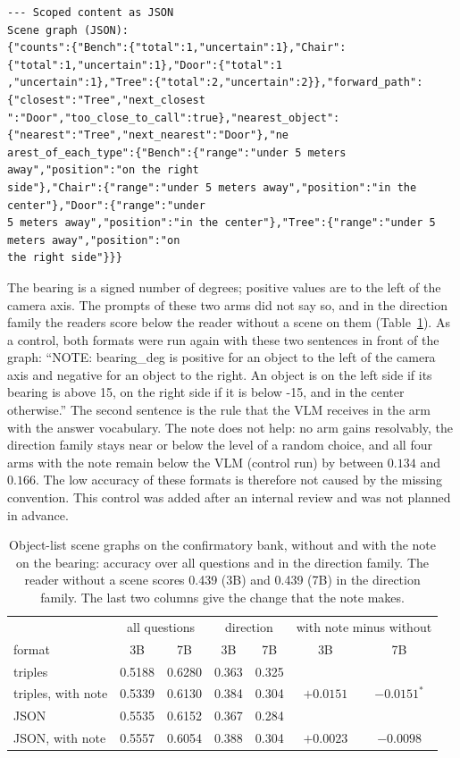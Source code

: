 \documentclass[10pt]{article}
\renewcommand{\thetable}{S\arabic{table}}
\newcommand{\settab}[1]{\setcounter{table}{#1}\addtocounter{table}{-1}\renewcommand{\thetable}{S\arabic{table}}}
\begin{document}
{\begin{verbatim}
--- Scoped content as JSON
Scene graph (JSON):
{"counts":{"Bench":{"total":1,"uncertain":1},"Chair":{"total":1,"uncertain":1},"Door":{"total":1
,"uncertain":1},"Tree":{"total":2,"uncertain":2}},"forward_path":{"closest":"Tree","next_closest
":"Door","too_close_to_call":true},"nearest_object":{"nearest":"Tree","next_nearest":"Door"},"ne
arest_of_each_type":{"Bench":{"range":"under 5 meters away","position":"on the right
side"},"Chair":{"range":"under 5 meters away","position":"in the center"},"Door":{"range":"under
5 meters away","position":"in the center"},"Tree":{"range":"under 5 meters away","position":"on
the right side"}}}
\end{verbatim}
}

The bearing is a signed number of degrees; positive values are to the left of the camera axis. The prompts of these two arms did not say so, and in the direction family the readers score below the reader without a scene on them (Table~\ref{tab:s17}). As a control, both formats were run again with these two sentences in front of the graph: ``NOTE: bearing\_deg is positive for an object to the left of the camera axis and negative for an object to the right. An object is on the left side if its bearing is above 15, on the right side if it is below -15, and in the center otherwise.'' The second sentence is the rule that the VLM receives in the arm with the answer vocabulary. The note does not help: no arm gains resolvably, the direction family stays near or below the level of a random choice, and all four arms with the note remain below the VLM (control run) by between $0.134$ and $0.166$. The low accuracy of these formats is therefore not caused by the missing convention. This control was added after an internal review and was not planned in advance.

\settab{17}\begin{table}[h]\centering\footnotesize
\caption{Object-list scene graphs on the confirmatory bank, without and with the note on the bearing: accuracy over all questions and in the direction family. The reader without a scene scores 0.439 (3B) and 0.439 (7B) in the direction family. The last two columns give the change that the note makes.}\label{tab:s17}
\begin{tabular}{@{}lcccccc@{}}
\toprule & \multicolumn{2}{c}{all questions} & \multicolumn{2}{c}{direction} & \multicolumn{2}{c}{with note minus without} \\
format & 3B & 7B & 3B & 7B & 3B & 7B \\ \midrule
triples & 0.5188 & 0.6280 & 0.363 & 0.325 & & \\
triples, with note & 0.5339 & 0.6130 & 0.384 & 0.304 & $+0.0151$ & $-0.0151^{*}$ \\
JSON & 0.5535 & 0.6152 & 0.367 & 0.284 & & \\
JSON, with note & 0.5557 & 0.6054 & 0.388 & 0.304 & $+0.0023$ & $-0.0098$ \\
\bottomrule
\end{tabular}
\end{table}
\end{document}
